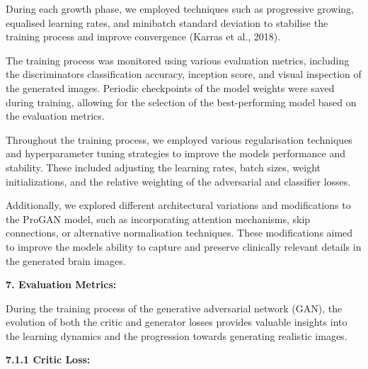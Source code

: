\documentclass[
]{article}
\begin{document}
During each growth phase, we employed techniques such as progressive
growing, equalised learning rates, and minibatch standard deviation to
stabilise the training process and improve convergence (Karras et al.,
2018).

The training process was monitored using various evaluation metrics,
including the discriminator\textquotesingle s classification accuracy,
inception score, and visual inspection of the generated images. Periodic
checkpoints of the model weights were saved during training, allowing
for the selection of the best-performing model based on the evaluation
metrics.

Throughout the training process, we employed various regularisation
techniques and hyperparameter tuning strategies to improve the
model\textquotesingle s performance and stability. These included
adjusting the learning rates, batch sizes, weight initializations, and
the relative weighting of the adversarial and classifier losses.

Additionally, we explored different architectural variations and
modifications to the ProGAN model, such as incorporating attention
mechanisms, skip connections, or alternative normalisation techniques.
These modifications aimed to improve the model\textquotesingle s ability
to capture and preserve clinically relevant details in the generated
brain images.

\textbf{7. Evaluation Metrics:}

During the training process of the generative adversarial network (GAN),
the evolution of both the critic and generator losses provides valuable
insights into the learning dynamics and the progression towards
generating realistic images.

\textbf{7.1.1 Critic Loss:}
\end{document}
